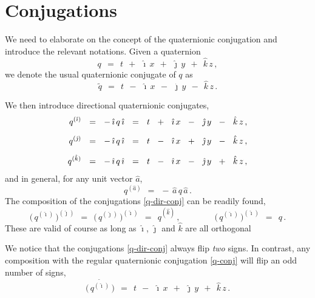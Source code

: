 \documentclass[epsfig,12pt]{article}
\def\beq{\begin{equation}}
\def\eeq{\end{equation}}
\newcommand{\wt}{\widetilde}
\newcommand{\ii}{\hat\imath}
\newcommand{\jj}{\hat\jmath}
\newcommand{\kk}{\hat k}
\begin{document}
\section{Conjugations}
\label{section-conjugations}
\setcounter{equation}{0}

	We need to elaborate on the concept of the quaternionic conjugation and introduce the relevant notations.
	Given a quaternion
\[
	q	~~=~~	t  ~~+~~  \ii\, x  ~~+~~  \jj\, y  ~~+~~  \kk\, z\,,
\]
	we denote the usual quaternionic conjugate of $ q $ as
\beq
\label{q-conj}
	\wt q	~~=~~	t  ~~-~~  \ii\, x  ~~-~~  \jj\, y  ~~-~~  \kk\, z\,.
\eeq

	We then introduce directional quaternionic conjugates,
\begin{align}
%
\notag
	q^{(\ii)}	& ~~=~~	-\,\ii\, q \, \ii	~~=~~	t  ~~+~~  \ii\, x  ~~-~~  \jj\, y  ~~-~~  \kk\, z\,,
	\\[2mm]
%
\label{q-dir-conj}
	q^{(\jj)}	& ~~=~~	-\,\ii\, q \, \ii	~~=~~	t  ~~-~~  \ii\, x  ~~+~~  \jj\, y  ~~-~~  \kk\, z\,,
	\\[2mm]
%
\notag
	q^{(\kk)}	& ~~=~~	-\,\ii\, q \, \ii	~~=~~	t  ~~-~~  \ii\, x  ~~-~~  \jj\, y  ~~+~~  \kk\, z\,,
\end{align}
	and in general, for any unit vector $ \hat a $,
\beq
	q^{(\hat a)}	~~=~~	-\, \hat a\, q \, \hat a\,.
\eeq
	The composition of the conjugations \eqref{q-dir-conj} can be readily found,
\[
	\big(\, q^{(\ii)} \,\big)^{(\jj)}	~~=~~	\big(\, q^{(\jj)} \,\big)^{(\ii)}	~~=~~	q^{(\kk)}\,,
	\qquad\qquad
	\big(\, q^{(\ii)} \,\big)^{(\ii)}	~~=~~	q\,.
\]
	These are valid of course as long as $ \ii $, $ \jj $ and $ \kk $ are all orthogonal
	
	We notice that the conjugations \eqref{q-dir-conj} always flip \emph{two} signs.
	In contrast, any composition with the regular quaternionic conjugation \eqref{q-conj} will flip an odd number of signs,
\[
	\overset{\wt{~~~}}{\big(\, q^{(\ii)} \,\big)}		~~=~~	t  ~~-~~  \ii\, x  ~~+~~  \jj\, y  ~~+~~  \kk\, z\,.
\]
\end{document}

